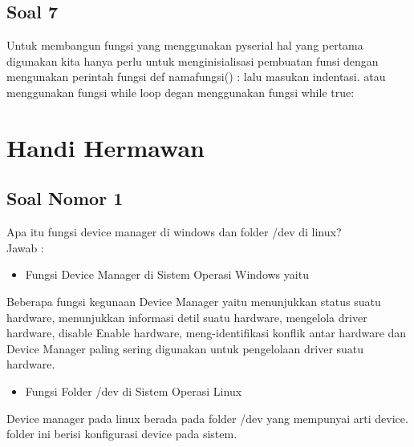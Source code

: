 	\subsection{Soal 7}
	Untuk membangun fungsi yang menggunakan pyserial hal yang pertama digunakan kita hanya perlu untuk menginisialisasi pembuatan funsi dengan mengunakan perintah fungsi def namafungsi() : lalu masukan indentasi. atau menggunakan fungsi while loop degan menggunakan  fungsi while true:



\section{Handi Hermawan}
\subsection{Soal Nomor 1}
Apa itu fungsi device manager di windows dan folder /dev di linux?\\
Jawab :
\begin{itemize}
\item Fungsi Device Manager di Sistem Operasi Windows yaitu
\end{itemize}
Beberapa fungsi kegunaan Device Manager yaitu menunjukkan status suatu hardware, menunjukkan informasi detil suatu hardware, mengelola driver hardware, disable  Enable hardware, meng-identifikasi konflik antar hardware dan Device Manager paling sering digunakan untuk pengelolaan driver suatu hardware. 
\begin{itemize}
\item Fungsi Folder /dev di Sistem Operasi Linux
\end{itemize}
Device manager pada linux berada pada folder /dev yang mempunyai arti device. folder ini berisi konfigurasi device pada sistem.


